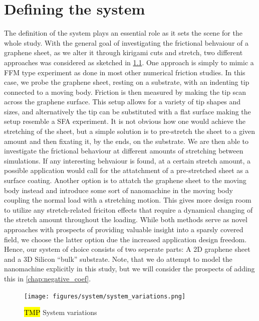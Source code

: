 \chapter{Defining the system}\label{chap:system}
The definition of the system plays an essential role as it sets the scene for
the whole study. With the general goal of investigating the frictional behvaiour
of a graphene sheet, as we alter it through kirigami cuts and stretch, two
different approaches was considered as sketched in \cref{fig:system_variations}.
One approach is simply to mimic a \acrshort{FFM} type experiment as done in most
other numerical friction studies. In this case, we probe the graphene sheet,
resting on a substrate, with an indenting tip connected to a moving body.
Friction is then measured by making the tip scan across the graphene surface.
This setup allows for a variety of tip shapes and sizes, and alternatively the
tip can be substituted with a flat surface making the setup resemble a
\acrshort{SFA} experiment. It is not obvious how one would achieve the
stretching of the sheet, but a simple solution is to pre-stretch the sheet to a
given amount and then fixating it, by the ends, on the substrate. We are then
able to investigate the frictional behaviour at different amounts of stretching
between simulations. If any interesting behvaiour is found, at a certain stretch
amount, a possible application would call for the attatchment of a pre-stretched
sheet as a surface coating. Another option is to attatch the graphene sheet to
the moving body instead and introduce some sort of nanomachine in the moving
body coupling the normal load with a stretching motion. This gives more
design room to utilize any stretch-related friciton effects that require a
dynamical changing of the stretch amount throughout the loading. While both
methods serve as novel approaches with prospects of providing valuable insight
into a sparsly covered field, we choose the latter option due the increased
application design freedom. Hence, our system of choice
consists of two seperate parts: A 2D graphene sheet and a 3D Silicon ``bulk''
substrate. Note, that we do attempt to model the nanomachine explicitly in this
study, but we will consider the prospects of adding this in
\cref{chap:negative_coef}. 


\begin{figure}[H]
  \centering
  \texttt{[image: figures/system/system\_variations.png]}
  \caption{\hl{TMP} System variations}
  \label{fig:system_variations}
\end{figure}


